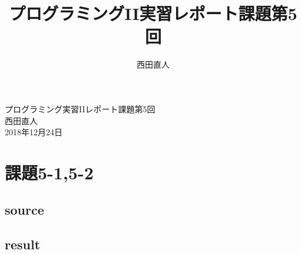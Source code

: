 \documentclass[10pt,a4paper]{jsarticle}
\title{プログラミングII実習レポート課題第5回}
\author{西田直人}
\begin{document}
\begin{center}
{\LARGE プログラミング実習IIレポート課題第5回} \\
\large
西田直人 \\ 2018年12月24日
\end{center}
\normalsize
\section{課題5-1,5-2}

\subsection{source}
\noindent















\subsection{result}
\end{document}
